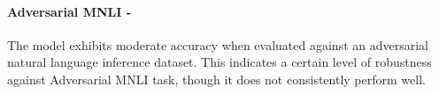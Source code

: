 \paragraph{Adversarial MNLI - \moderate} 
The model exhibits moderate accuracy when evaluated against an adversarial natural language inference dataset. This indicates a certain level of robustness against Adversarial MNLI task, though it does not consistently perform well. 
